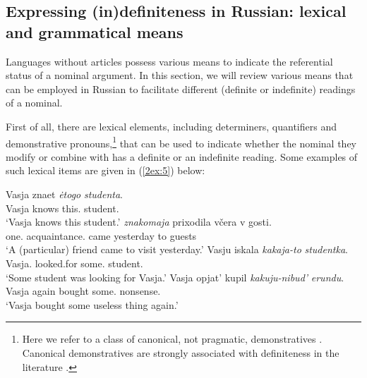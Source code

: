 \documentclass[output=paper]{langsci/langscibook}
\begin{document}
\subsection{Expressing (in)definiteness in Russian: lexical and grammatical means}\label{2sec:21}


Languages without articles possess various means to indicate the referential status of a nominal argument. In this section, we will review various means that can be employed in Russian to facilitate different (definite or indefinite) readings of a nominal. 


First of all, there are lexical elements, including determiners, quantifiers and demonstrative pronouns,\footnote{Here we refer to a class of canonical, not pragmatic, demonstratives \citep[cf.][]{elbourne:08}. Canonical demonstratives are strongly associated with definiteness in the literature \citep[see, for instance,][]{lyons:99,wolter:04,elbourne:08}.} that can be used to indicate whether the nominal they modify or combine with has a definite or an indefinite reading. Some examples of such lexical items are given in (\ref{2ex:5}) below:

\begin{exe}
\ex\label{2ex:5}
	\begin{xlista}
	\ex\label{2ex:5a}
	\gll	Vasja 	znaet 	{\emph{ėtogo}} 		{\emph{studenta}}. \\
		Vasja 	knows 	this.{} 	student.{} \\
	\glt	`Vasja knows this student.'
	\ex\label{2ex:5b}
	 		{\emph{znakomaja}}			prixodila 	v\v{c}era 	v 	gosti. \\
		one.{}	acquaintance.{} 	came 	yesterday 	to 	guests \\
	\glt	`A (particular) friend came to visit yesterday.'
	\ex\label{2ex:5c}
	\gll	Vasju 			iskala 		{\emph{kakaja-to}} 		{\emph{studentka}}. \\
		Vasja.{} 	looked.for 		some.{} 	student.{} \\
	\glt	`Some student was looking for Vasja.'
	\ex\label{2ex:5d}
	\gll 	Vasja opjat' 	kupil 		{\emph{kakuju-nibud'}}	{\emph{erundu}}. \\
		Vasja again 	bought 	some.{} 		nonsense.{} \\
	\glt	`Vasja bought some useless thing again.'
	\end{xlista}
\end{exe}
\end{document}
